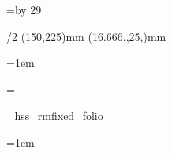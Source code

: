 
\def\myred{\setcmykcolor{0 1 1 0.25}}



\fontfam[dante]


\currvar

\typosize[12/14.30]


\def\mnotefont{\typosize[10.5/11.5]\it}
\def\captionfont{\typosize[10.5/11.5]\it}



\hsize=100mm
\vsize=\topskip \advance \vsize by 29\baselineskip

\margins/2 (150,225)mm (16.666,,25,)mm



\everymnote{\noindent\mnotefont\parindent0.5em}
\mnotesize=5pc
\mnoteindent=1em



\baselineskip
\newif\iffootline \footlinetrue

\footline={%
	\iffootline
		\ifodd\pageno
			\_hss\_rmfixed\_folio\hss
		\else
			\hss\_rmfixed\_folio\_hss
		\fi
	\else
		\global\footlinetrue
	\fi
}



\svlang


\newcount\piccount
\def\picref#1{%
	\incr\piccount
	\label[#1]\wlabel{\the\piccount}%
	\the\piccount
}


\parskip=0pt
\parindent=1em



\def\startblockquote{%
	\par
	\vskip\baselineskip
	\advance\leftskip by 2\parindent
	\rightskip=\leftskip
	\_firstnoindent
	\it
}

